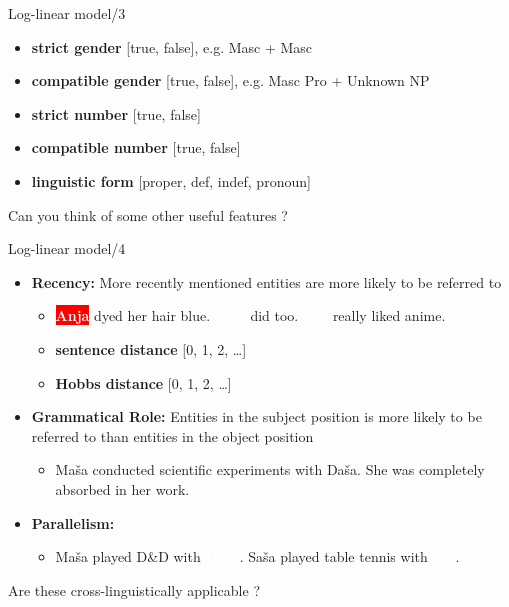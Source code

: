 \documentclass[dvipsnames, 10pt, compress]{beamer}
\newcommand{\redfillbox}[1]{\colorbox{red}{\textcolor{white}{{\bf #1}}}}
\newcommand{\bluefillbox}[1]{\colorbox{ProcessBlue}{\textcolor{white}{{\bf #1}}}}
\begin{document}
\begin{frame}{Log-linear model/3} %

\begin{itemize}
  \item \textbf{strict gender} [true, false], e.g. Masc + Masc
  \item \textbf{compatible gender} [true, false], e.g. Masc Pro + Unknown NP
  \item \textbf{strict number} [true, false]
  \item \textbf{compatible number} [true, false]
  \item \textbf{linguistic form} [proper, def, indef, pronoun]
\end{itemize}

Can you think of some other useful features ? 

\end{frame}

\begin{frame}{Log-linear model/4}

\begin{itemize}
 \item \textbf{Recency:} More recently mentioned entities are more likely to be referred to 
 \begin{itemize}
   \item \redfillbox{Anja} dyed her hair blue. \bluefillbox{Saša} did too. \bluefillbox{She} really liked anime.
  \item \textbf{sentence distance} [0, 1, 2, \ldots]
  \item \textbf{Hobbs distance} [0, 1, 2, \ldots] 
 \end{itemize}
 \item \textbf{Grammatical Role:} Entities in the subject position is 
more likely to be referred to than entities in the object 
position 
  \begin{itemize}
    \item Maša conducted scientific experiments with Daša. She was completely absorbed in her work.
  \end{itemize}
 \item \textbf{Parallelism:}
  \begin{itemize}
    \item Maša played D\&D with \bluefillbox{Daša}. Saša played table tennis with \bluefillbox{her}.
  \end{itemize}
\end{itemize}

Are these cross-linguistically applicable ? 

\end{frame}
\end{document}

